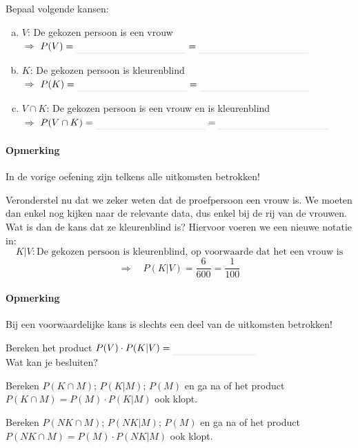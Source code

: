 \documentclass[12pt,twoside]{article}
\begin{document}
\begin{oefening}
Bepaal volgende kansen:
\begin{enumerate}[(a)]
  \item $V$: De gekozen persoon is een vrouw\\$\Rightarrow$ $P(V)=\arule{4cm}=\arule{4cm}$
  \item $K$: De gekozen persoon is kleurenblind\\$\Rightarrow$ $P(K)=\arule{4cm}=\arule{4cm}$
  \item $V\cap K$: De gekozen persoon is een vrouw en is kleurenblind\\$\Rightarrow$ $P(V\cap K)=\arule{4cm}=\arule{4cm}$
\end{enumerate}
\end{oefening}

\paragraph*{Opmerking} In de vorige oefening zijn telkens alle uitkomsten betrokken!


Veronderstel nu dat we zeker weten dat de proefpersoon een vrouw is. We moeten dan enkel nog kijken naar de relevante data, dus enkel bij de rij van de vrouwen. Wat is dan de kans dat ze kleurenblind is? Hiervoor voeren we een nieuwe notatie in:
$$K|V:\mbox{De gekozen persoon is kleurenblind, op voorwaarde dat het een vrouw is}$$
$$\Rightarrow\quad P(K|V)=\dfrac{6}{600}=\dfrac{1}{100}$$

\paragraph*{Opmerking} Bij een voorwaardelijke kans is slechts een deel van de uitkomsten betrokken!

\begin{oefening}
Bereken het product $P(V)\cdot P(K|V)=\arule{3cm}$\\
Wat kan je besluiten?
\end{oefening}

\begin{oefening}
Bereken $P(K\cap M)$; $P(K|M)$; $P(M)$ en ga na of het product $P(K\cap M)=P(M)\cdot P(K|M)$ ook klopt.
\end{oefening}

\begin{oefening}
Bereken $P(NK\cap M)$; $P(NK|M)$; $P(M)$ en ga na of het product $P(NK\cap M)=P(M)\cdot P(NK|M)$ ook klopt.
\end{oefening}
\end{document}
